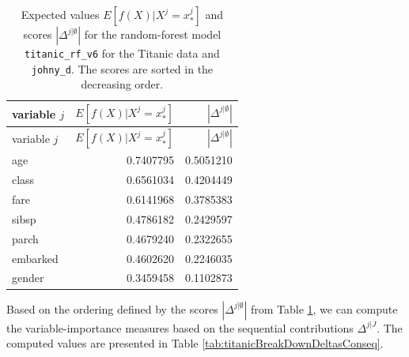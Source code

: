 \documentclass[12pt,]{krantz}
\begin{document}
\begin{longtable}[]{@{}lrr@{}}
\caption{\label{tab:titanicBreakDownDeltas} Expected values \(E[f(X) | X^j = x^j_*]\) and scores \(|\Delta^{j|\emptyset}|\) for the random-forest model \texttt{titanic\_rf\_v6} for the Titanic data and \texttt{johny\_d}. The scores are sorted in the decreasing order.}\tabularnewline
\toprule
variable \(j\) & \(E[f(X) | X^j = x^j_*]\) & \(|\Delta^{j|\emptyset}|\)\tabularnewline
\midrule
\endfirsthead
\toprule
variable \(j\) & \(E[f(X) | X^j = x^j_*]\) & \(|\Delta^{j|\emptyset}|\)\tabularnewline
\midrule
\endhead
age & 0.7407795 & 0.5051210\tabularnewline
class & 0.6561034 & 0.4204449\tabularnewline
fare & 0.6141968 & 0.3785383\tabularnewline
sibsp & 0.4786182 & 0.2429597\tabularnewline
parch & 0.4679240 & 0.2322655\tabularnewline
embarked & 0.4602620 & 0.2246035\tabularnewline
gender & 0.3459458 & 0.1102873\tabularnewline
\bottomrule
\end{longtable}

Based on the ordering defined by the scores \(|\Delta^{j|\emptyset}|\) from Table \ref{tab:titanicBreakDownDeltas}, we can compute the variable-importance measures based on the sequential contributions \(\Delta^{j|J}\). The computed values are presented in Table \ref{tab:titanicBreakDownDeltasConseq}.
\end{document}
